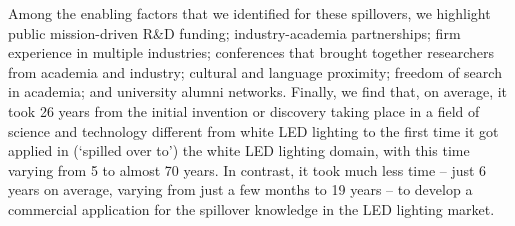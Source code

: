 \documentclass[parskip=full]{article}
\begin{document}
Among the enabling factors that we identified for these spillovers, we highlight public mission-driven R\&D funding; industry-academia partnerships; firm experience in multiple industries; conferences that brought together researchers from academia and industry; cultural and language proximity; freedom of search in academia; and university alumni networks.
Finally, we find that, on average, it took 26 years from the initial invention or discovery taking place in a field of science and technology different from white LED lighting to the first time it got applied in (‘spilled over to’) the white LED lighting domain, with this time varying from 5 to almost 70 years. In contrast, it took much less time – just 6 years on average, varying from just a few months to 19 years – to develop a commercial application for the spillover knowledge in the LED lighting market.
\end{document}
